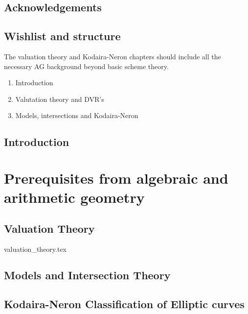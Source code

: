 


\rmfamily
\setcounter{page}{0}
\newpage
\tableofcontents
\listoftodos
\chapter*{Acknowledgements} \label{chap:acknowledgements}

\setcounter{chapter}{-1}
\chapter{Wishlist and structure} \label{chap:wishlist}
The valuation theory and Kodaira-Neron chapters should include all the necessary AG background beyond basic scheme theory. 
\begin{enumerate}
	\item Introduction
	\item Valutation theory and DVR's
	\item Models, intersections and Kodaira-Neron
\end{enumerate}


\setcounter{page}{0}

\chapter{Introduction} \label{chap:introduction}
%

\part{Prerequisites from algebraic and arithmetic geometry}
\chapter{Valuation Theory} \label{chap:valuation_theory}
{valuation_theory.tex}



\chapter{Models and Intersection Theory} \label{chap:models_and_intersection_theory}

\chapter{Kodaira-Neron Classification of Elliptic curves} \label{chap:kodaira-neron_classification_of_elliptic_curves}

